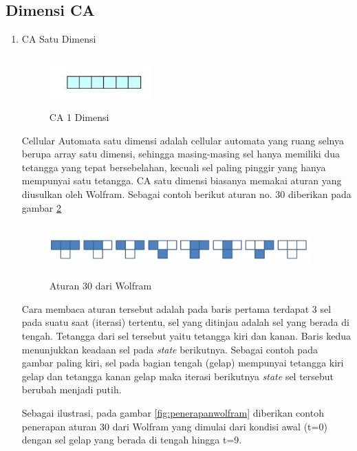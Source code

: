 \subsection{Dimensi CA}
		\begin{enumerate}
			\item CA Satu Dimensi
			
				\begin{figure} [H]
					\centering  
					\includegraphics[width=4cm, height=2cm]{CA1D} 
					\caption[CA 1 Dimensi]{CA 1 Dimensi} 
					\label{fig:CA1D} 
				\end{figure}
			
			Cellular Automata satu dimensi adalah cellular automata yang ruang selnya berupa array satu dimensi, sehingga masing-masing sel hanya memiliki dua tetangga yang tepat bersebelahan, kecuali sel paling pinggir yang hanya mempunyai satu tetangga. CA satu dimensi biasanya memakai aturan yang diusulkan oleh Wolfram. Sebagai contoh berikut aturan no. 30 diberikan pada gambar \ref{fig:wolfram}
			
			
			\begin{figure} [H]
					\centering  
					\includegraphics[width=10cm, height=2cm]{wolfram} 
					\caption[Aturan 30 dari Wolfram]{Aturan 30 dari Wolfram} 
					\label{fig:wolfram} 
				\end{figure}
				
				Cara membaca aturan tersebut adalah pada baris pertama terdapat 3 sel pada suatu saat (iterasi) tertentu, sel yang ditinjau adalah sel yang berada di tengah. Tetangga dari sel tersebut yaitu tetangga kiri dan kanan. Baris kedua menunjukkan keadaan sel pada \textit{state} berikutnya. Sebagai contoh pada gambar paling kiri, sel pada bagian tengah (gelap) mempunyai tetangga kiri gelap dan tetangga kanan gelap maka iterasi berikutnya \textit{state} sel tersebut berubah menjadi putih.
				
				Sebagai ilustrasi, pada gambar \ref{fig:penerapanwolfram} diberikan contoh penerapan aturan 30 dari Wolfram yang dimulai dari kondisi awal (t=0) dengan sel gelap yang berada di tengah hingga t=9. \cite{ECA}
				

\end{enumerate}
